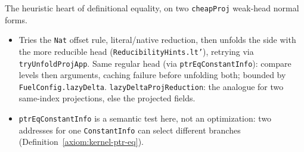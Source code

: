 \begin{definition}
\label{def:kernel-lazy-delta}
\leanok
{}

 The heuristic heart of definitional equality, on two \texttt{cheapProj} weak-head
normal forms.
\begin{itemize}
\item Tries the \texttt{Nat} offset rule, literal/native reduction, then unfolds the side with
the more reducible head (\texttt{ReducibilityHints.lt'}), retrying via \texttt{tryUnfoldProjApp}.
Same regular head (via \texttt{ptrEqConstantInfo}): compare levels then arguments, caching failure
before unfolding both; bounded by \texttt{FuelConfig.lazyDelta}.
\texttt{lazyDeltaProjReduction}: the analogue for two same-index projections, else the projected
fields.
\item {} \texttt{ptrEqConstantInfo} is a semantic test here, not an optimization: two
addresses for one \texttt{ConstantInfo} can select different branches
(Definition~\ref{axiom:kernel-ptr-eq}).
\end{itemize}
\end{definition}

